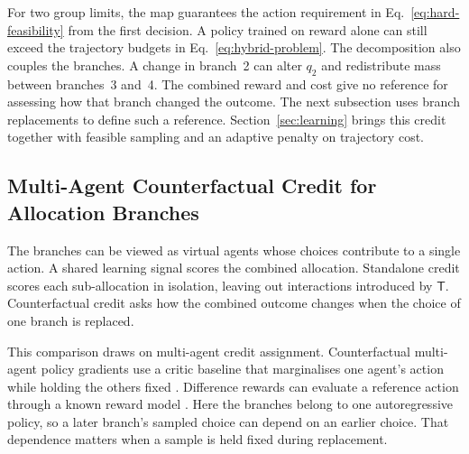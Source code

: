 \documentclass[10pt]{article}
\begin{document}
For two group limits, the map guarantees the action requirement in Eq.~\eqref{eq:hard-feasibility} from the first decision. A policy trained on reward alone can still exceed the trajectory budgets in Eq.~\eqref{eq:hybrid-problem}. The decomposition also couples the branches. A change in branch~2 can alter $q_2$ and redistribute mass between branches~3 and~4. The combined reward and cost give no reference for assessing how that branch changed the outcome. The next subsection uses branch replacements to define such a reference. Section~\ref{sec:learning} brings this credit together with feasible sampling and an adaptive penalty on trajectory cost.

\subsection{Multi-Agent Counterfactual Credit for Allocation Branches}

The branches can be viewed as virtual agents whose choices contribute to a single action. A shared learning signal scores the combined allocation. Standalone credit scores each sub-allocation in isolation, leaving out interactions introduced by $\mathsf T$. Counterfactual credit asks how the combined outcome changes when the choice of one branch is replaced.

This comparison draws on multi-agent credit assignment. Counterfactual multi-agent policy gradients use a critic baseline that marginalises one agent's action while holding the others fixed \citep{foerster2018}. Difference rewards can evaluate a reference action through a known reward model \citep{castellini2025}. Here the branches belong to one autoregressive policy, so a later branch's sampled choice can depend on an earlier choice. That dependence matters when a sample is held fixed during replacement.
\end{document}
